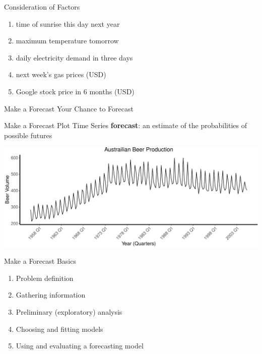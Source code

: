 \documentclass[
  ignorenonframetext,
]{beamer}
\providecommand{\tightlist}{%
  \setlength{\itemsep}{0pt}\setlength{\parskip}{0pt}}
\begin{document}
\begin{frame}{Consideration of Factors}
\protect\hypertarget{consideration-of-factors}{}
\begin{enumerate}
\tightlist
\item
  time of sunrise this day next year \newline \pause
\item
  maximum temperature tomorrow \newline \pause
\item
  daily electricity demand in three days \newline \pause
\item
  next week's gas prices (USD) \newline \pause
\item
  Google stock price in 6 months (USD)
\end{enumerate}
\end{frame}

\begin{frame}{Make a Forecast}
\protect\hypertarget{make-a-forecast}{}
\center Your Chance to Forecast
\end{frame}

\begin{frame}{Make a Forecast \textbar{} \small Plot Time Series}
\protect\hypertarget{make-a-forecast-plot-time-series}{}
\textbf{forecast}: an estimate of the probabilities of possible futures

\includegraphics{Time-series-regression-models_files/figure-beamer/unnamed-chunk-3-1.pdf}
\end{frame}

\begin{frame}{Make a Forecast \textbar{} \small Basics}
\protect\hypertarget{make-a-forecast-basics}{}
\begin{enumerate}
\tightlist
\item
  Problem definition \newline
\item
  Gathering information \newline
\item
  Preliminary (exploratory) analysis \newline
\item
  Choosing and fitting models \newline
\item
  Using and evaluating a forecasting model
\end{enumerate}
\end{frame}
\end{document}
